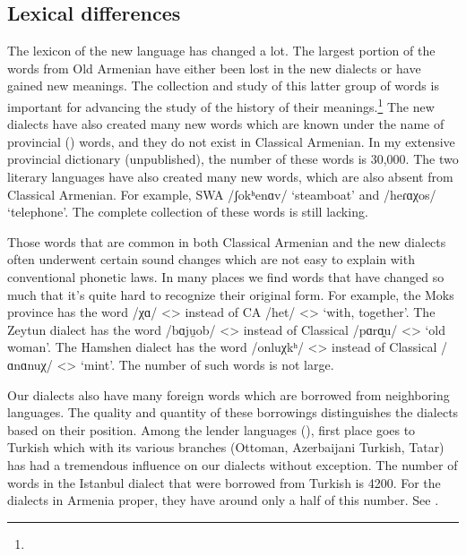 \subsection{Lexical differences}

The lexicon of the new language has changed a lot. The largest portion of the words from Old Armenian have either been lost in the new dialects or have gained new meanings. The collection and study of this latter group of words is important for advancing the study of the history of their meanings.\footnote{} The new dialects have also created many new words which are known under the name of provincial () words, and they do not exist in Classical Armenian. In my extensive provincial dictionary (unpublished), the number of these words is 30,000. The two literary languages have also created many new words, which are also absent from Classical Armenian. For example, SWA /ʃokʰenɑv/  `steamboat' and /heɾɑχos/  `telephone'. The complete collection of these words is still lacking.


\begin{adjarianpage}\label{page:19}\end{adjarianpage}%

Those words that are common in both Classical Armenian and the new dialects often underwent certain sound changes which are not easy to explain with conventional phonetic laws. In many places we find words that have changed so much that it's quite hard to recognize their original form. For example, the Moks province has the word /χɑ/ <> instead of CA /het/ <> `with, together'. The Zeytun dialect has the word /bɑju̯ob/ <> instead of Classical /pɑrɑ̯u/ <> `old woman'. The Hamshen dialect has the word /onluχkʰ/ <> instead of Classical /ɑnɑnuχ/ <> `mint'. The number of such words is not large. 

Our dialects also have many foreign words which are borrowed from neighboring languages. The quality and quantity of these borrowings distinguishes the dialects based on their position. Among the lender languages (), first place goes to Turkish which with its various branches (Ottoman, Azerbaijani Turkish, Tatar) has had a tremendous influence on our dialects without exception. The number of words in the Istanbul dialect that were borrowed from Turkish is 4200. For the dialects in Armenia proper, they have around only a half of this number. See \citet{Adjarian-1902-TUrkishWordsArmenian}. 

